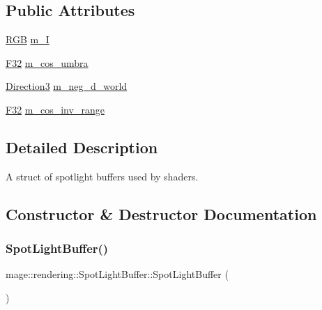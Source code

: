 \subsection*{Public Attributes}
\begin{DoxyCompactItemize}
\item 
\mbox{\hyperlink{structmage_1_1_r_g_b}{R\+GB}} \mbox{\hyperlink{structmage_1_1rendering_1_1_spot_light_buffer_ab67a7ecde450e0096563c4be789156c9}{m\+\_\+I}}
\item 
\mbox{\hyperlink{namespacemage_aa97e833b45f06d60a0a9c4fc22ae02c0}{F32}} \mbox{\hyperlink{structmage_1_1rendering_1_1_spot_light_buffer_afa3c23903a4b31bf6b7da537d7f9b660}{m\+\_\+cos\+\_\+umbra}}
\item 
\mbox{\hyperlink{structmage_1_1_direction3}{Direction3}} \mbox{\hyperlink{structmage_1_1rendering_1_1_spot_light_buffer_a66c4eccce12de2ee271877665eb3c3a3}{m\+\_\+neg\+\_\+d\+\_\+world}}
\item 
\mbox{\hyperlink{namespacemage_aa97e833b45f06d60a0a9c4fc22ae02c0}{F32}} \mbox{\hyperlink{structmage_1_1rendering_1_1_spot_light_buffer_a80c169b3f3e87c7d91a7b2b4473e4136}{m\+\_\+cos\+\_\+inv\+\_\+range}}
\end{DoxyCompactItemize}


\subsection{Detailed Description}
A struct of spotlight buffers used by shaders. 

\subsection{Constructor \& Destructor Documentation}
\mbox{\label{structmage_1_1rendering_1_1_spot_light_buffer_a603e2c40ae924a2183f24604297715aa}} 
\subsubsection{\texorpdfstring{Spot\+Light\+Buffer()}{SpotLightBuffer()}\hspace{0.1cm}{\footnotesize\ttfamily [1/3]}}
{\footnotesize\ttfamily mage\+::rendering\+::\+Spot\+Light\+Buffer\+::\+Spot\+Light\+Buffer (\begin{DoxyParamCaption}{ }\end{DoxyParamCaption})\hspace{0.3cm}{\ttfamily [noexcept]}}


